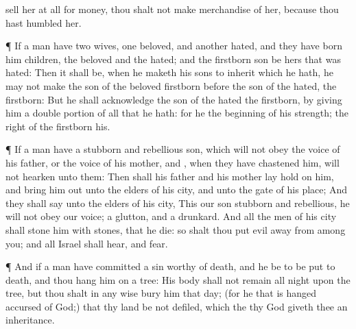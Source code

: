 {sell her at
all for
money, thou shalt not make
merchandise of her,
because thou hast
humbled her.
\par }{\PP {}¶ If a
man have
two
wives,
one
beloved, and
another
hated, and they have
born him
children,
{} the
beloved and the
hated; and
{} the
firstborn
son be hers that was
hated:
Then it shall be,
when he maketh his
sons to
inherit
{} which he hath,
{} he
may not make the
son of the
beloved
firstborn
before the
son of the
hated,
{} the
firstborn:
But he shall
acknowledge the
son of the
hated
{} the
firstborn, by
giving him a
double
portion of all that he
hath: for he
{} the
beginning of his
strength; the
right of the
firstborn
{} his.
\par }{\PP {}¶ If a
man have a
stubborn and
rebellious
son, which will not
obey the
voice of his
father, or the
voice of his
mother, and
{}, when they have
chastened him, will not
hearken unto them:
Then shall his
father and his
mother lay
hold on him, and bring him
out unto the
elders of his
city, and unto the
gate of his
place;
And they shall
say unto the
elders of his
city, This our
son
{}
stubborn and
rebellious, he will not
obey our
voice;
{} a
glutton, and a
drunkard.
And all the
men of his
city shall
stone him with
stones, that he
die: so shalt thou
put
evil
away from
among you; and all
Israel shall
hear, and
fear.
\par }{\PP {}¶ And if a
man have committed a
sin worthy
of
death, and he be to be put to
death, and thou
hang him on a
tree:
His
body shall not remain all
night upon the
tree, but thou shalt in any
wise
bury him that
day; (for he that is
hanged
{}
accursed of
God;) that thy
land be not
defiled, which the
{} thy
God
giveth thee
{} an
inheritance.

}
